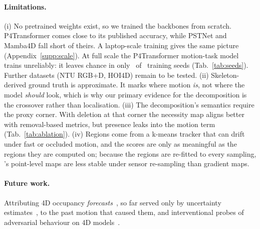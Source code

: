 \paragraph{Limitations.}
(i) No pretrained weights exist, so we trained the backbones from scratch. P4Transformer comes close to its published accuracy, while PSTNet and Mamba4D fall short of theirs. A laptop-scale training gives the same picture (Appendix~\ref{supp:scale}). At full scale the P4Transformer motion-task model trains unreliably: it leaves chance in only \NumXSeedsTrained\ of \NumXSeedsTotal\ training seeds (Tab.~\ref{tab:seeds}). Further datasets (NTU RGB+D, HOI4D) remain to be tested. (ii) Skeleton-derived ground truth is approximate. It marks where motion \emph{is}, not where the model \emph{should} look, which is why our primary evidence for the decomposition is the crossover rather than localisation. (iii) The decomposition's semantics require the proxy corner. With deletion at that corner the necessity map aligns better with removal-based metrics, but presence leaks into the motion term (Tab.~\ref{tab:ablation}). (iv) Regions come from a k-means tracker that can drift under fast or occluded motion, and the scores are only as meaningful as the regions they are computed on; because the regions are re-fitted to every sampling, \method's point-level maps are less stable under sensor re-sampling than gradient maps.

\paragraph{Future work.}
Attributing 4D occupancy \emph{forecasts}~\cite{tian2023occ3d,ma2024cam4docc}, so far served only by uncertainty estimates~\cite{reliocc2025,kalble2025evocc,occuq2025}, to the past motion that caused them, and interventional probes of adversarial behaviour on 4D models~\cite{tan2023onepoint,li2021foolinglidar}.
